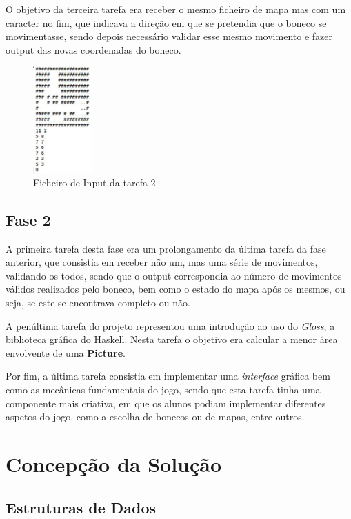 \documentclass[a4paper]{article}
\begin{document}
O objetivo da terceira tarefa era receber o mesmo ficheiro de mapa mas com um caracter no fim, que indicava a direção em que se pretendia que o boneco se movimentasse, sendo depois necessário validar esse mesmo movimento e fazer output das novas coordenadas do boneco.

\begin{figure}[ht]
	\centering
	\includegraphics[width=0.2\textwidth]{Recursos/mapaMovimento.jpg}
	\caption{Ficheiro de Input da tarefa 2}
\end{figure}

\subsection{Fase 2}
A primeira tarefa desta fase era um prolongamento da última tarefa da fase anterior, que consistia em receber não um, mas uma série de movimentos, validando-os todos, sendo que o output correspondia ao número de movimentos válidos realizados pelo boneco, bem como o estado do mapa após os mesmos, ou seja, se este se encontrava completo ou não.

A penúltima tarefa do projeto representou uma introdução ao uso do \emph{Gloss}, a biblioteca gráfica do Haskell. Nesta tarefa o objetivo era calcular a menor área envolvente de uma \textbf{Picture}. 

Por fim, a última tarefa consistia em implementar uma \textit{interface} gráfica bem como as mecânicas fundamentais do jogo, sendo que esta tarefa tinha uma componente mais criativa, em que os alunos podiam implementar diferentes aspetos do jogo, como a escolha de bonecos ou de mapas, entre outros.


\section{Concepção da Solução}
\label{sec:solucao}

\subsection{Estruturas de Dados}
\end{document}
